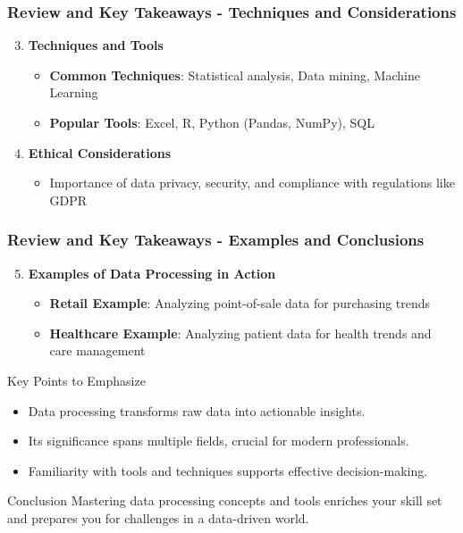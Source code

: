 \documentclass[aspectratio=169]{beamer}
\begin{document}
\begin{frame}[fragile]
    \frametitle{Review and Key Takeaways - Techniques and Considerations}
    \begin{enumerate}
        \setcounter{enumi}{2}
        \item \textbf{Techniques and Tools}
            \begin{itemize}
                \item \textbf{Common Techniques}: Statistical analysis, Data mining, Machine Learning
                \item \textbf{Popular Tools}: Excel, R, Python (Pandas, NumPy), SQL
            \end{itemize}
        
        \item \textbf{Ethical Considerations}
            \begin{itemize}
                \item Importance of data privacy, security, and compliance with regulations like GDPR
            \end{itemize}
    \end{enumerate}
\end{frame}

\begin{frame}[fragile]
    \frametitle{Review and Key Takeaways - Examples and Conclusions}
    \begin{enumerate}
        \setcounter{enumi}{4}
        \item \textbf{Examples of Data Processing in Action}
            \begin{itemize}
                \item \textbf{Retail Example}: Analyzing point-of-sale data for purchasing trends
                \item \textbf{Healthcare Example}: Analyzing patient data for health trends and care management
            \end{itemize}
    \end{enumerate}
    
    \begin{block}{Key Points to Emphasize}
        \begin{itemize}
            \item Data processing transforms raw data into actionable insights.
            \item Its significance spans multiple fields, crucial for modern professionals.
            \item Familiarity with tools and techniques supports effective decision-making.
        \end{itemize}
    \end{block}
    
    \begin{block}{Conclusion}
        Mastering data processing concepts and tools enriches your skill set and prepares you for challenges in a data-driven world.
    \end{block}
\end{frame}
\end{document}

